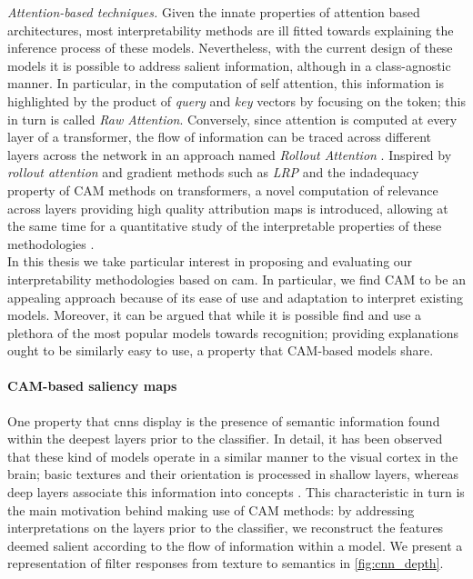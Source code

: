 \noindent \emph{Attention-based techniques.} Given the innate properties of attention based 
architectures, most interpretability methods are ill fitted towards explaining the inference 
process of these models. Nevertheless, with the current design of these models it is possible to 
address salient information, although in a class-agnostic manner. In particular, in the computation 
of self attention, this information is highlighted by the product of \emph{query} and \emph{key} 
vectors by focusing on the \Th{[CLS]} token; this in turn is called \emph{Raw Attention}. 
Conversely, since attention is computed at every layer of a transformer, the flow of information 
can be traced across different layers across the network in an approach named \emph{Rollout 
Attention} \autocite{abnar2020quantifying}. Inspired by \emph{rollout attention} and gradient 
methods such as \emph{LRP} \autocite{bach2015pixel} and the indadequacy property of CAM methods on 
transformers, a novel computation of relevance across layers providing high quality attribution 
maps is introduced, allowing at the same time for a quantitative study of the interpretable 
properties of these methodologies \autocite{chefer2021transformer}.\\

In this thesis we take particular interest in proposing and evaluating our interpretability 
methodologies based on \gls{cam}. In particular, we find CAM to be an appealing approach because of 
its ease of use and adaptation to interpret existing models. Moreover, it can be argued that while 
it is possible find and use a plethora of the most popular models towards recognition; providing 
explanations ought to be similarly easy to use, a property that CAM-based models share.
\paragraph{CAM-based saliency maps}
One property that \glspl{cnn} display is the presence of semantic information found within the 
deepest layers prior to the classifier. In detail, it has been observed that these kind of models 
operate in a similar manner to the visual cortex in the brain; basic textures and their orientation 
is processed in shallow layers, whereas deep layers associate this information into concepts 
\autocite{hubel1959receptive}. This characteristic in turn is the main motivation behind making 
use of CAM methods: by addressing interpretations on the layers prior to the classifier, we 
reconstruct the features deemed salient according to the flow of information within a model. We 
present a representation of filter responses from texture to semantics in \autoref{fig:cnn_depth}.

